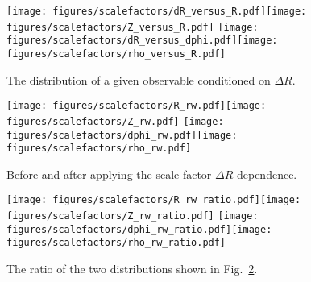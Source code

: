 \documentclass[UKenglish,texlive=2013]{\ATLASLATEXPATH atlasdoc}
\begin{document}
\begin{figure}[htpb!]
\begin{center}
\texttt{[image: figures/scalefactors/dR\_versus\_R.pdf]}\texttt{[image: figures/scalefactors/Z\_versus\_R.pdf]}
\texttt{[image: figures/scalefactors/dR\_versus\_dphi.pdf]}\texttt{[image: figures/scalefactors/rho\_versus\_R.pdf]}
\caption[]{The distribution of a given observable conditioned on $\Delta R$.} 
\label{fig:appscalefactors2}
\end{center}
\end{figure}

\begin{figure}[htpb!]
\begin{center}
\texttt{[image: figures/scalefactors/R\_rw.pdf]}\texttt{[image: figures/scalefactors/Z\_rw.pdf]}
\texttt{[image: figures/scalefactors/dphi\_rw.pdf]}\texttt{[image: figures/scalefactors/rho\_rw.pdf]}
\caption[]{Before and after applying the scale-factor $\Delta R$-dependence.} 
\label{fig:appscalefactors3}
\end{center}
\end{figure}

\begin{figure}[htpb!]
\begin{center}
\texttt{[image: figures/scalefactors/R\_rw\_ratio.pdf]}\texttt{[image: figures/scalefactors/Z\_rw\_ratio.pdf]}
\texttt{[image: figures/scalefactors/dphi\_rw\_ratio.pdf]}\texttt{[image: figures/scalefactors/rho\_rw\_ratio.pdf]}
\caption[]{The ratio of the two distributions shown in Fig.~\ref{fig:appscalefactors3}.} 
\label{fig:appscalefactors4}
\end{center}
\end{figure}

\clearpage

\printbibliography
%
%

\clearpage
{}
\end{document}
